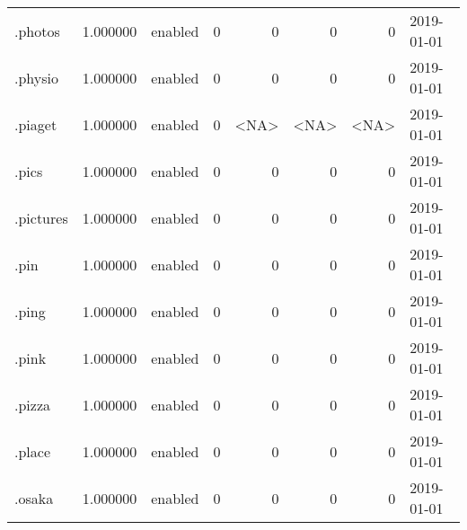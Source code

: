 \begin{tabular}{lrlrrrrl}
.photos                   &          1.000000 &         enabled &                           0 &                           0 &                           0 &                   0 &           2019-01-01 \\
.physio                   &          1.000000 &         enabled &                           0 &                           0 &                           0 &                   0 &           2019-01-01 \\
.piaget                   &          1.000000 &         enabled &                           0 &                        <NA> &                        <NA> &                <NA> &           2019-01-01 \\
.pics                     &          1.000000 &         enabled &                           0 &                           0 &                           0 &                   0 &           2019-01-01 \\
.pictures                 &          1.000000 &         enabled &                           0 &                           0 &                           0 &                   0 &           2019-01-01 \\
.pin                      &          1.000000 &         enabled &                           0 &                           0 &                           0 &                   0 &           2019-01-01 \\
.ping                     &          1.000000 &         enabled &                           0 &                           0 &                           0 &                   0 &           2019-01-01 \\
.pink                     &          1.000000 &         enabled &                           0 &                           0 &                           0 &                   0 &           2019-01-01 \\
.pizza                    &          1.000000 &         enabled &                           0 &                           0 &                           0 &                   0 &           2019-01-01 \\
.place                    &          1.000000 &         enabled &                           0 &                           0 &                           0 &                   0 &           2019-01-01 \\
.osaka                    &          1.000000 &         enabled &                           0 &                           0 &                           0 &                   0 &           2019-01-01 \\

\end{tabular}
